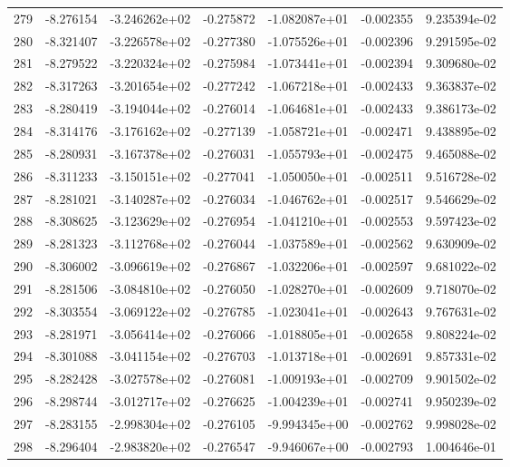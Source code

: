 \begin{tabular}{rrrrrrr}
 279 &  -8.276154 & -3.246262e+02 & -0.275872 & -1.082087e+01 &  -0.002355 &  9.235394e-02 \\
 280 &  -8.321407 & -3.226578e+02 & -0.277380 & -1.075526e+01 &  -0.002396 &  9.291595e-02 \\
 281 &  -8.279522 & -3.220324e+02 & -0.275984 & -1.073441e+01 &  -0.002394 &  9.309680e-02 \\
 282 &  -8.317263 & -3.201654e+02 & -0.277242 & -1.067218e+01 &  -0.002433 &  9.363837e-02 \\
 283 &  -8.280419 & -3.194044e+02 & -0.276014 & -1.064681e+01 &  -0.002433 &  9.386173e-02 \\
 284 &  -8.314176 & -3.176162e+02 & -0.277139 & -1.058721e+01 &  -0.002471 &  9.438895e-02 \\
 285 &  -8.280931 & -3.167378e+02 & -0.276031 & -1.055793e+01 &  -0.002475 &  9.465088e-02 \\
 286 &  -8.311233 & -3.150151e+02 & -0.277041 & -1.050050e+01 &  -0.002511 &  9.516728e-02 \\
 287 &  -8.281021 & -3.140287e+02 & -0.276034 & -1.046762e+01 &  -0.002517 &  9.546629e-02 \\
 288 &  -8.308625 & -3.123629e+02 & -0.276954 & -1.041210e+01 &  -0.002553 &  9.597423e-02 \\
 289 &  -8.281323 & -3.112768e+02 & -0.276044 & -1.037589e+01 &  -0.002562 &  9.630909e-02 \\
 290 &  -8.306002 & -3.096619e+02 & -0.276867 & -1.032206e+01 &  -0.002597 &  9.681022e-02 \\
 291 &  -8.281506 & -3.084810e+02 & -0.276050 & -1.028270e+01 &  -0.002609 &  9.718070e-02 \\
 292 &  -8.303554 & -3.069122e+02 & -0.276785 & -1.023041e+01 &  -0.002643 &  9.767631e-02 \\
 293 &  -8.281971 & -3.056414e+02 & -0.276066 & -1.018805e+01 &  -0.002658 &  9.808224e-02 \\
 294 &  -8.301088 & -3.041154e+02 & -0.276703 & -1.013718e+01 &  -0.002691 &  9.857331e-02 \\
 295 &  -8.282428 & -3.027578e+02 & -0.276081 & -1.009193e+01 &  -0.002709 &  9.901502e-02 \\
 296 &  -8.298744 & -3.012717e+02 & -0.276625 & -1.004239e+01 &  -0.002741 &  9.950239e-02 \\
 297 &  -8.283155 & -2.998304e+02 & -0.276105 & -9.994345e+00 &  -0.002762 &  9.998028e-02 \\
 298 &  -8.296404 & -2.983820e+02 & -0.276547 & -9.946067e+00 &  -0.002793 &  1.004646e-01 \\

\end{tabular}
